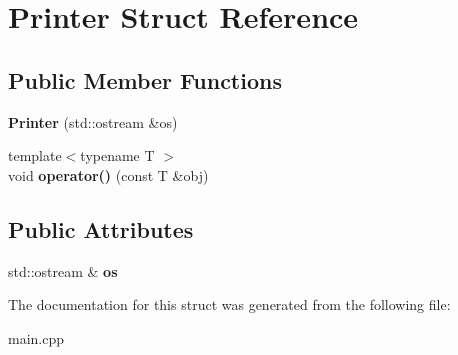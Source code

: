 \hypertarget{struct_printer}{}\section{Printer Struct Reference}
\label{struct_printer}
\subsection*{Public Member Functions}
\begin{DoxyCompactItemize}
\item 
\mbox{\label{struct_printer_a48a978e4d866ed8462b5aae4fa238b7c}} 
{\bfseries Printer} (std\+::ostream \&os)
\item 
\mbox{\label{struct_printer_ae556fdf28494ef0e8c46d5bf8ce59899}} 
{\footnotesize template$<$typename T $>$ }\\void {\bfseries operator()} (const T \&obj)
\end{DoxyCompactItemize}
\subsection*{Public Attributes}
\begin{DoxyCompactItemize}
\item 
\mbox{\label{struct_printer_a96e24dc8390d3aba4993780282b330ae}} 
std\+::ostream \& {\bfseries os}
\end{DoxyCompactItemize}


The documentation for this struct was generated from the following file\+:\begin{DoxyCompactItemize}
\item 
main.\+cpp\end{DoxyCompactItemize}

